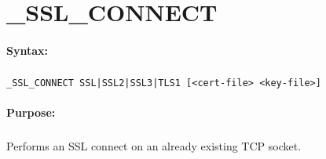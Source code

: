 
\newpage
\section{\_SSL\_CONNECT}
\label{cmd:_SSL_CONNECT}

\paragraph{Syntax:}
\subparagraph{}
\texttt{\_SSL\_CONNECT SSL|SSL2|SSL3|TLS1 [<cert-file> <key-file>]}

\paragraph{Purpose:}
\subparagraph{}
Performs an SSL connect on an already existing TCP socket.

